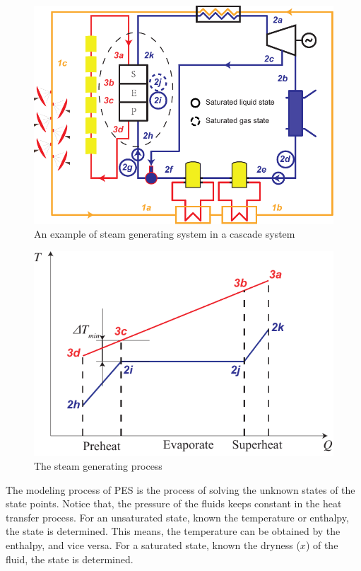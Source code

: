 \noindent \begin{figure}[!ht]
\begin{center}
	\includegraphics[width = 0.8\columnwidth]{fig/PES}
	\caption{An example of steam generating system in a cascade system}
	\label{fig:PES}
\end{center}
\end{figure}

\noindent \begin{figure}[htbp]
\begin{center}
	\includegraphics[width = 0.8\columnwidth]{fig/PES_TQ}
	\caption{The steam generating process}
	\label{fig:PES_TQ}
\end{center}
\end{figure}

The modeling process of PES is the process of solving the unknown states of the state points. Notice that, the pressure of the fluids keeps constant in the heat transfer process. For an unsaturated state, known the temperature or enthalpy, the state is determined. This means, the temperature can be obtained by the enthalpy, and vice versa. For a saturated state, known the dryness ($x$) of the fluid, the state is determined.

